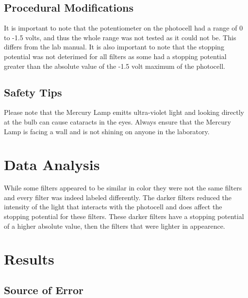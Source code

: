 \documentclass[a4paper]{article}
\begin{document}
\subsection{Procedural Modifications}

\qq It is important to note that the potentiometer on the photocell
had a range of 0 to -1.5 volts, and thus the whole range was not
tested as it could not be. This differs from the lab manual. It is
also important to note that the stopping potential was not deterimed
for all filters as some had a stopping potential greater than the
absolute value of the -1.5 volt maximum of the photocell.

\subsection{Safety Tips}

\qq Please note that the Mercury Lamp emitts ultra-violet light and
looking directly at the bulb can cause cataracts in the eyes. Always
ensure that the Mercury Lamp is facing a wall and is not shining on
anyone in the laboratory.


\section{Data Analysis}


\qq While some filters appeared to be similar in color they were not
the same filters and every filter was indeed labeled differently. The
darker filters reduced the intensity of the light that interacts with
the photocell and does affect the stopping potential for these
filters. These darker filters have a stopping potential of a higher
absolute value, then the filters that were lighter in appearence. 


\section{Results}


\subsection{Source of Error}
\end{document}
